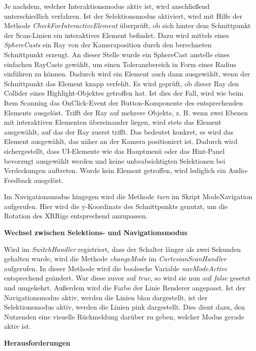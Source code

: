 Je nachdem, welcher Interaktionsmodus aktiv ist, wird anschließend unterschiedlich verfahren. Ist der Selektionsmodus aktiviert, wird mit Hilfe der Methode \textit{CheckForInteractiveElement} überprüft, ob sich hinter dem Schnittpunkt der Scan-Linien ein interaktives Element befindet. Dazu wird mittels eines \textit{SphereCasts} ein Ray von der Kameraposition durch den berechneten Schnittpunkt erzeugt. An dieser Stelle wurde ein SphereCast anstelle eines einfachen RayCasts gewählt, um einen Toleranzbereich in Form eines Radius einführen zu können. Dadurch wird ein Element auch dann ausgewählt, wenn der Schnittpunkt das Element knapp verfehlt. Es wird geprüft, ob dieser Ray den Collider eines Highlight-Objektes getroffen hat. Ist dies der Fall, wird wie beim Item Scanning das OnClick-Event der Button-Komponente des entsprechenden Elements ausgelöst. Trifft der Ray auf mehrere Objekte, z. B. wenn zwei Ebenen mit interaktiven Elementen übereinander liegen, wird stets das Element ausgewählt, auf das der Ray zuerst trifft. Das bedeutet konkret, es wird das Element ausgewählt, das näher an der Kamera positioniert ist. Dadurch wird sichergestellt, dass UI-Elemente wie das Hauptmenü oder das Hint-Panel bevorzugt ausgewählt werden und keine unbeabsichtigten Selektionen bei Verdeckungen auftreten. Wurde kein Element getroffen, wird lediglich ein Audio-Feedback ausgelöst. 

Im Navigationsmodus hingegen wird die Methode \textit{turn} im Skript ModeNavigation aufgerufen. Hier wird die y-Koordinate des Schnittpunkts genutzt, um die Rotation des XRRigs entsprechend anzupassen.

\textbf{Wechsel zwischen Selektions- und Navigationsmodus}

Wird im \textit{SwitchHandler} registriert, dass der Schalter länger als zwei Sekunden gehalten wurde, wird die Methode \textit{changeMode} im \textit{CartesianScanHandler} aufgerufen. In dieser Methode wird die boolesche Variable \textit{navModeActive} entsprechend geändert. War diese zuvor auf \textit{true}, so wird sie nun auf \textit{false} gesetzt und umgekehrt. Außerdem wird die Farbe der Linie Renderer angepasst. Ist der Navigationsmodus aktiv, werden die Linien blau dargestellt, ist der Selektionsmodus aktiv, werden die Linien pink dargestellt. Dies dient dazu, den Nutzenden eine visuelle Rückmeldung darüber zu geben, welcher Modus gerade aktiv ist. 

\textbf{Herausforderungen}

